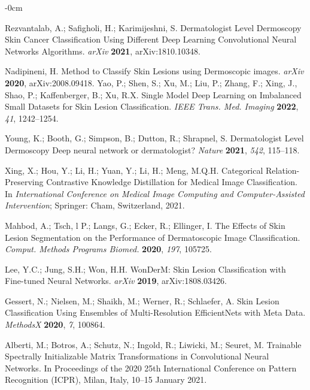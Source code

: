 \documentclass[sensors,article,accept,pdftex,moreauthors]{Definitions/mdpi}
\begin{document}
\begin{adjustwidth}{-\extralength}{0cm}
\begin{thebibliography}{999}
Rezvantalab, A.; Safigholi, H.; Karimijeshni, S. Dermatologist Level Dermoscopy Skin Cancer Classification Using Different Deep Learning Convolutional Neural Networks Algorithms. 
{\em arXiv} 
{\bf 2021}, arXiv:1810.10348.		

Nadipineni, H. Method to Classify Skin Lesions using Dermoscopic images. {\em arXiv} 
{\bf 2020}, arXiv:2008.09418.		
Yao, P.; Shen, S.; Xu, M.; Liu, P.; Zhang, F.;  Xing, J., Shao, P.; Kaffenberger, B.; Xu, R.X. 
Single Model Deep Learning on Imbalanced Small Datasets for Skin Lesion Classification. 
{\em IEEE Trans. Med. Imaging} 
{\bf 2022}, \emph{41}, 1242--1254.
		
Young, K.; Booth, G.; Simpson, B.; Dutton, R.; Shrapnel, S.  Dermatologist Level Dermoscopy Deep neural network or dermatologist? {\em Nature} 
{\bf {2021}}, \emph{542}, 115--118.%

		
Xing, X.; Hou, Y.; Li, H.; Yuan, Y.; Li, H.; Meng, M.Q.H.
  Categorical Relation-Preserving Contrastive Knowledge Distillation for Medical Image Classification. 
In  \emph{International Conference on Medical Image Computing and Computer-Assisted Intervention}; Springer: Cham, Switzerland, 
{2021}.
		

Mahbod, A.; Tsch, l P.; Langs, G.; Ecker, R.; Ellinger, I.  The Effects of Skin Lesion Segmentation on the Performance of Dermatoscopic Image Classification.
{\em Comput. Methods Programs Biomed.} 
{\bf 2020}, \emph{197}, 105725.

Lee, Y.C.; Jung, S.H.; Won, H.H. WonDerM: Skin Lesion Classification with Fine-tuned Neural Networks.
{\em arXiv} 
{\bf 2019}, arXiv:1808.03426.

Gessert, N.; Nielsen, M.; Shaikh, M.; Werner, R.; Schlaefer, A. Skin Lesion Classification Using Ensembles of Multi-Resolution EfficientNets with Meta Data. 
{\em MethodsX} 
{\bf 2020}, \emph{7}, 100864.		

Alberti, M.; Botros, A.; Schutz, N.; Ingold, R.; Liwicki, M.; Seuret, M. Trainable Spectrally Initializable Matrix Transformations in Convolutional Neural Networks. In Proceedings of the 2020 25th International Conference on Pattern Recognition (ICPR), Milan, Italy, 10--15 January 2021.
		

\end{thebibliography}
\end{adjustwidth}
\end{document}
